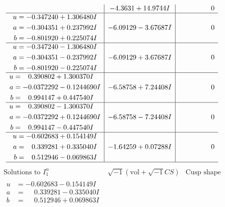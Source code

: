 \documentclass[1p]{elsarticle_modified}
\theoremstyle{definition}
\newcommand{\I}{\sqrt{-1}}
\begin{document}
$$\begin{array}{c|c|c}
 & -4.3631 + 14.9744 I & \phantom{-0.000000 } 0 \\ \hline\begin{aligned}
u &= -0.347240 + 1.306480 I \\
a &= -0.304351 + 0.237992 I \\
b &= -0.801920 + 0.225074 I\end{aligned}
 & -6.09129 - 3.67687 I & \phantom{-0.000000 } 0 \\ \hline\begin{aligned}
u &= -0.347240 - 1.306480 I \\
a &= -0.304351 - 0.237992 I \\
b &= -0.801920 - 0.225074 I\end{aligned}
 & -6.09129 + 3.67687 I & \phantom{-0.000000 } 0 \\ \hline\begin{aligned}
u &= \phantom{-}0.390802 + 1.300370 I \\
a &= -0.0372292 - 0.1244690 I \\
b &= \phantom{-}0.994147 + 0.447540 I\end{aligned}
 & -6.58758 + 7.24408 I & \phantom{-0.000000 } 0 \\ \hline\begin{aligned}
u &= \phantom{-}0.390802 - 1.300370 I \\
a &= -0.0372292 + 0.1244690 I \\
b &= \phantom{-}0.994147 - 0.447540 I\end{aligned}
 & -6.58758 - 7.24408 I & \phantom{-0.000000 } 0 \\ \hline\begin{aligned}
u &= -0.602683 + 0.154149 I \\
a &= \phantom{-}0.339281 + 0.335040 I \\
b &= \phantom{-}0.512946 - 0.069863 I\end{aligned}
 & -1.64259 + 0.07288 I & \phantom{-0.000000 } 0\\
 \hline 
 \end{array}$$\newpage$$\begin{array}{c|c|c}  
\text{Solutions to }I^u_{1}& \I (\text{vol} + \sqrt{-1}CS) & \text{Cusp shape}\\
 \hline 
\begin{aligned}
u &= -0.602683 - 0.154149 I \\
a &= \phantom{-}0.339281 - 0.335040 I \\
b &= \phantom{-}0.512946 + 0.069863 I\end{aligned}

\end{array}$$
\end{document}
